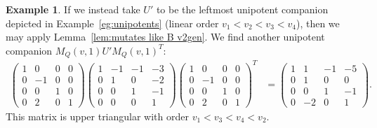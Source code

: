 \documentclass[11pt, letterpaper]{amsart}
\theoremstyle{definition}
\newtheorem{example}[theorem]{Example}
\numberwithin{equation}{section}
\begin{document}
\begin{example}
If we instead take $U'$ to be the leftmost unipotent companion depicted in Example~\ref{eg:unipotents} (linear order $v_1 < v_2 < v_3 < v_4$), then we may apply Lemma~\ref{lem:mutates like B v2gen}.
We find another unipotent companion $M_Q(v, 1) U' M_Q(v, 1)^T$:
\begin{align*}
\begin{pmatrix}
1 & 0 & 0 & 0 \\
0 & -1 & 0 & 0 \\
0 & 0 & 1 & 0 \\
0 & 2 & 0 & 1
\end{pmatrix}
\begin{pmatrix} 1 & -1 &  -1 & -3 \\ 0 & 1 & 0 & -2 \\ 0 & 0 & 1 & -1\\ 0 & 0 & 0 & 1 \end{pmatrix} 
\begin{pmatrix}
1 & 0 & 0 & 0 \\
0 & -1 & 0 & 0 \\
0 & 0 & 1 & 0 \\
0 & 2 & 0 & 1
\end{pmatrix}^T
&= \begin{pmatrix}
1 & 1 & -1 & -5 \\
0 & 1 & 0 & 0 \\
0 & 0 & 1 & -1 \\
0 & -2 & 0 & 1
\end{pmatrix}.
\end{align*}
This matrix is upper triangular with order $v_1 < v_3 < v_4 < v_2$.
\end{example}
\end{document}
